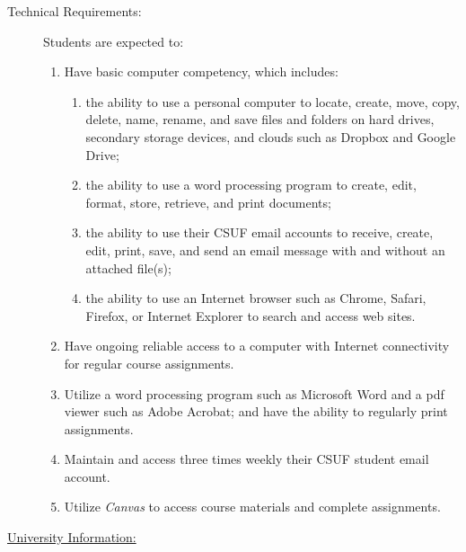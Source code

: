 \documentclass[11pt]{article}
\begin{document}
\begin{description}
\begin{description}
	\item[Technical Requirements:] Students are expected to:
	\begin{enumerate}
		\item Have basic computer competency, which includes:
		\begin{enumerate}
			\item the ability to use a personal computer to locate, create, move, copy, delete, name, rename, and save files and folders on hard drives, secondary storage devices, and clouds such as Dropbox and Google Drive;
			\item the ability to use a word processing program to create, edit, format, store, retrieve, and print documents;
			\item the ability to use their CSUF email accounts to receive, create, edit, print, save, and send an email message with and without an attached file(s);
			\item the ability to use an Internet browser such as Chrome, Safari, Firefox, or Internet Explorer to search and access web sites.
		\end{enumerate}
		\item Have ongoing reliable access to a computer with Internet connectivity for regular course assignments.
		\item Utilize a word processing program such as Microsoft Word and a pdf viewer such as Adobe Acrobat; and have the ability to regularly print assignments.
		\item Maintain and access three times weekly their CSUF student email account.
		\item Utilize \emph{Canvas} to access course materials and complete assignments.
	\end{enumerate}
	
	\end{description}


\item \underline{University Information:}


\end{description}
\end{document}

